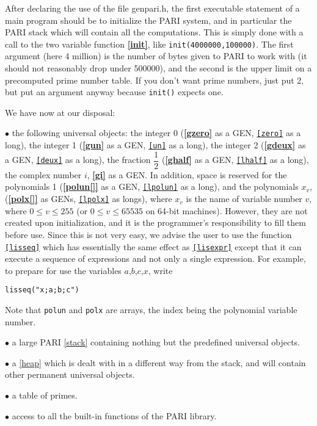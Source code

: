 After declaring the use of the file genpari.h, the first executable statement
of a main program should be to initialize the PARI system, and in particular
the PARI stack which will contain all the computations. This is simply done
with a call to the two variable function {\bf \ref{init}}, like 
{\tt init(4000000,100000)}.
The first argument (here 4 million) is the number of bytes given to PARI to
work with (it should not reasonably drop under 500000), and the second is the
upper limit on a precomputed prime number table. If you don't want prime numbers,
just put 2, but put an argument anyway because {\tt init()} expects one.

We have now at our disposal:

$\bullet$ the following universal objects: the integer 0 ({\bf \ref{gzero}} as a GEN,
{\tt \ref{zero}} as a long), the integer 1 ({\bf \ref{gun}} as a GEN, {\tt \ref{un}} as a long), the integer 2
({\bf \ref{gdeux}} as a GEN, {\tt \ref{deux}} as a long), the fraction $\dfrac 1 2$ ({\bf \ref{ghalf}} as
a GEN, {\tt \ref{lhalf}} as a long), the complex number $i$, {\bf \ref{gi}} as a GEN. In addition, space is 
reserved for the polynomials 1 ({\bf \ref{polun[]}} as a GEN, {\tt \ref{lpolun}} as a long),
and the polynomials $x_v$, ({\bf \ref{polx[]}} as GENs, {\tt \ref{lpolx}} as longs), where
$x_v$ is the name of variable number $v$, where $0\le v\le 255$
(or $0\le v\le 65535$ on 64-bit machines). However, 
they are not created upon initialization, and it is the programmer's
responsibility to fill them before use. Since this is not very easy, we
advise the user to use the function {\tt \ref{lisseq}} which has essentially
the same effect as {\tt \ref{lisexpr}} except that it can execute a sequence of
expressions and not only a single expression. For example, to prepare for use
the variables $a$,$b$,$c$,$x$, write 

\centerline{\tt lisseq("x;a;b;c")}

Note that {\tt polun} and {\tt polx} are arrays, the index being the 
polynomial variable number.

$\bullet$ a large PARI \ref{stack} containing nothing but 
the predefined universal objects.

$\bullet$ a \ref{heap} which is dealt with in a different way from the stack,
and will contain other permanent universal objects.

$\bullet$ a table of primes.

$\bullet$ access to all the built-in functions of the PARI library.

